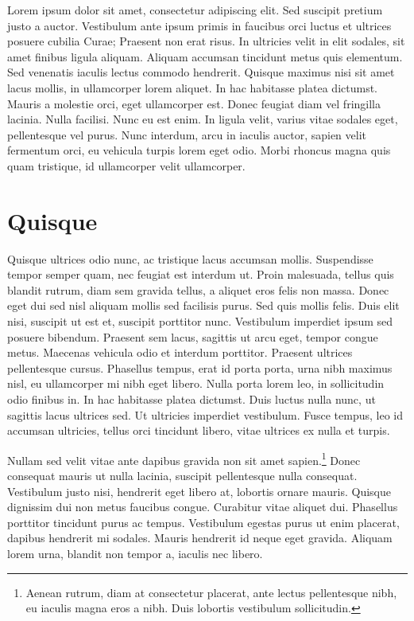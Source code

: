 Lorem ipsum dolor sit amet, consectetur adipiscing elit. Sed suscipit pretium justo a auctor. Vestibulum ante ipsum primis in faucibus orci luctus et ultrices posuere cubilia Curae; Praesent non erat risus. In ultricies velit in elit sodales, sit amet finibus ligula aliquam. Aliquam accumsan tincidunt metus quis elementum. Sed venenatis iaculis lectus commodo hendrerit. Quisque maximus nisi sit amet lacus mollis, in ullamcorper lorem aliquet. In hac habitasse platea dictumst. Mauris a molestie orci, eget ullamcorper est. Donec feugiat diam vel fringilla lacinia. Nulla facilisi. Nunc eu est enim. In ligula velit, varius vitae sodales eget, pellentesque vel purus. Nunc interdum, arcu in iaculis auctor, sapien velit fermentum orci, eu vehicula turpis lorem eget odio. Morbi rhoncus magna quis quam tristique, id ullamcorper velit ullamcorper.

\section{Quisque}

Quisque ultrices odio nunc, ac tristique lacus accumsan mollis. Suspendisse tempor semper quam, nec feugiat est interdum ut. Proin malesuada, tellus quis blandit rutrum, diam sem gravida tellus, a aliquet eros felis non massa. Donec eget dui sed nisl aliquam mollis sed facilisis purus. Sed quis mollis felis. Duis elit nisi, suscipit ut est et, suscipit porttitor nunc. Vestibulum imperdiet ipsum sed posuere bibendum. Praesent sem lacus, sagittis ut arcu eget, tempor congue metus. Maecenas vehicula odio et interdum porttitor. Praesent ultrices pellentesque cursus. Phasellus tempus, erat id porta porta, urna nibh maximus nisl, eu ullamcorper mi nibh eget libero. Nulla porta lorem leo, in sollicitudin odio finibus in. In hac habitasse platea dictumst. Duis luctus nulla nunc, ut sagittis lacus ultrices sed. Ut ultricies imperdiet vestibulum. Fusce tempus, leo id accumsan ultricies, tellus orci tincidunt libero, vitae ultrices ex nulla et turpis.

Nullam sed velit vitae ante dapibus gravida non sit amet sapien.\footnote{Aenean rutrum, diam at consectetur placerat, ante lectus pellentesque nibh, eu iaculis magna eros a nibh. Duis lobortis vestibulum sollicitudin.} Donec consequat mauris ut nulla lacinia, suscipit pellentesque nulla consequat. Vestibulum justo nisi, hendrerit eget libero at, lobortis ornare mauris. Quisque dignissim dui non metus faucibus congue. Curabitur vitae aliquet dui. Phasellus porttitor tincidunt purus ac tempus. Vestibulum egestas purus ut enim placerat, dapibus hendrerit mi sodales. Mauris hendrerit id neque eget gravida. Aliquam lorem urna, blandit non tempor a, iaculis nec libero.

